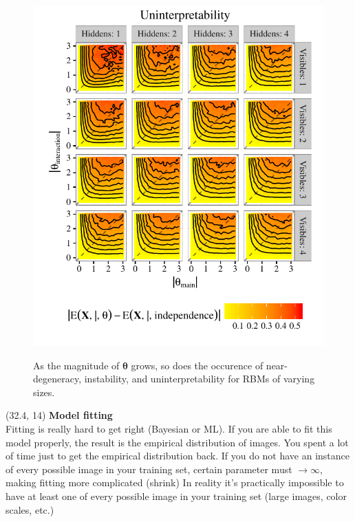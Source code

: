 \documentclass[extrafontsizes, 30pt]{memoir}
\begin{document}
\begin{textblock}{14}
\begin{figure}
\includegraphics{images/uninterpretability.pdf}
\label{fig:three_ways}
\caption{As the magnitude of $\boldsymbol \theta$ grows, so does the occurence of near-degeneracy, instability, and uninterpretability for RBMs of varying sizes.}
\end{figure}
\end{textblock}

\begin{textblock}{14}(32.4, 14)
{\large \bfseries Model fitting} \\[.25cm]
Fitting is really hard to get right (Bayesian or ML).
If you are able to fit this model properly, the result is the empirical distribution of images.
You spent a lot of time just to get the empirical distribution back.
If you do not have an instance of every possible image in your training set, certain parameter must $\rightarrow \infty$, making fitting more complicated (shrink)
In reality it's practically impossible to have at least one of every possible image in your training set (large images, color scales, etc.)

\end{textblock}
\end{document}
